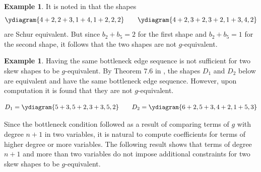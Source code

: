 \documentclass[12pt]{amsart}
\theoremstyle{definition}
\newtheorem{ex}[thm]{Example}
\newcommand{\Becky}[1]{\todo[size=\tiny,inline,color=blue!30]{#1
      \\ \hfill --- B.}}
\begin{document}
\begin{ex}
It is noted in \cite{rsw2009coincidences} that the shapes \[\ydiagram{4+2,2+3,1+4,1+2,2,2}\qquad \ydiagram{4+2,3+2,3+2,1+3,4,2}\] are Schur equivalent. But since $b_2 + b_5 = 2$ for the first shape and $b_2+b_5 = 1$ for the second shape, it follows that the two shapes are not $g$-equivalent.
\end{ex}

\begin{ex} 
Having the same bottleneck edge sequence is not sufficient for two skew shapes to be $g$-equivalent. By Theorem $7.6$ in \cite{rsw2009coincidences}, the shapes $D_1$ and $D_2$ below are equivalent and have the same bottleneck edge sequence. However, upon computation it is found that they are not $g$-equivalent. 

\[
D_1 = \ydiagram{5+3,5+2,3+3,5,2}\qquad
D_2 = \ydiagram{6+2,5+3,4+2,1+5,3}
\]
\end{ex}

Since the bottleneck condition followed as a result of comparing terms of $g$ with degree $n+1$ in two variables, it is natural to compute coefficients for terms of higher degree or more variables. The following result shows that terms of degree $n+1$ and more than two variables do not impose additional constraints for two skew shapes to be $g$-equivalent.
\end{document}

